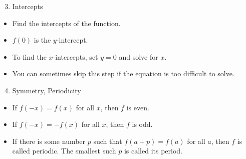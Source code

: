 \begin{frame}[t]
\begin{enumerate}
\setcounter{enumi}{2}
\item  Intercepts
\end{enumerate}
\begin{itemize}
\item  Find the intercepts of the function.
\item  $f(0)$ is the $y$-intercept.
\item  To find the $x$-intercepts, set $y = 0$ and solve for $x$.
\item  You can sometimes skip this step if the equation is too difficult to solve.
\end{itemize}
\end{frame}


\begin{frame}[t]
\begin{enumerate}
\setcounter{enumi}{3}
\item  Symmetry, Periodicity
\end{enumerate}
\begin{itemize}
\item<1-| alert@2>  \alert<handout:1| 0>{If $f(-x) = f(x)$ for all $x$, then $f$ is even.}
\item<1-| alert@3>  \alert<handout:2| 0>{If $f(-x) = -f(x)$ for all $x$, then $f$ is odd.}
\item<1-| alert@4>  \alert<handout:3| 0>{If there is some number $p$ such that $f(a+p) = f(a)$ for all $a$, then $f$ is called periodic.  The smallest such $p$ is called its period.}
\end{itemize}
\begin{center}

\ 
\end{center}
\end{frame}
